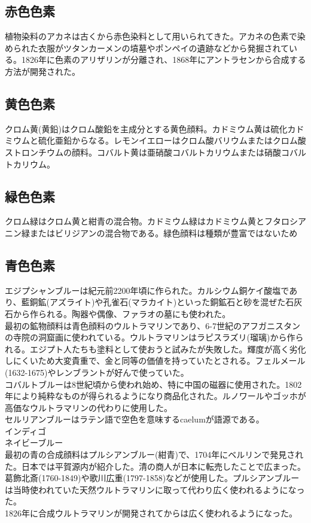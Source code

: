 	\subsection{赤色色素}
		植物染料のアカネは古くから赤色染料として用いられてきた。アカネの色素で染められた衣服がツタンカーメンの墳墓やポンペイの遺跡などから発掘されている。1826年に色素のアリザリンが分離され、1868年にアントラセンから合成する方法が開発された。
	\subsection{黄色色素}
		クロム黄(黄鉛)はクロム酸鉛を主成分とする黄色顔料。カドミウム黄は硫化カドミウムと硫化亜鉛からなる。レモンイエローはクロム酸バリウムまたはクロム酸ストロンチウムの顔料。コバルト黄は亜硝酸コバルトカリウムまたは硝酸コバルトカリウム。
	\subsection{緑色色素}
		クロム緑はクロム黄と紺青の混合物。カドミウム緑はカドミウム黄とフタロシアニン緑またはビリジアンの混合物である。緑色顔料は種類が豊富ではないため
	\subsection{青色色素}
		エジプシャンブルーは紀元前2200年頃に作られた。カルシウム銅ケイ酸塩であり、藍銅鉱(アズライト)や孔雀石(マラカイト)といった銅鉱石と砂を混ぜた石灰石から作られる。陶器や偶像、ファラオの墓にも使われた。\\
		最初の鉱物顔料は青色顔料のウルトラマリンであり、6-7世紀のアフガニスタンの寺院の洞窟画に使われている。ウルトラマリンはラピスラズリ(瑠璃)から作られる。エジプト人たちも塗料として使おうと試みたが失敗した。輝度が高く劣化しにくいため大変貴重で、金と同等の価値を持っていたとされる。フェルメール(1632-1675)やレンブラントが好んで使っていた。\\
		コバルトブルーは8世紀頃から使われ始め、特に中国の磁器に使用された。1802年により純粋なものが得られるようになり商品化された。ルノワールやゴッホが高価なウルトラマリンの代わりに使用した。\\
		セルリアンブルーはラテン語で空色を意味するcaelumが語源である。\\
		インディゴ\\
		ネイビーブルー\\
		最初の青の合成顔料はプルシアンブルー(紺青)で、1704年にベルリンで発見された。日本では平賀源内が紹介した。清の商人が日本に転売したことで広まった。葛飾北斎(1760-1849)や歌川広重(1797-1858)などが使用した。プルシアンブルーは当時使われていた天然ウルトラマリンに取って代わり広く使われるようになった。\\
		1826年に合成ウルトラマリンが開発されてからは広く使われるようになった。\\
